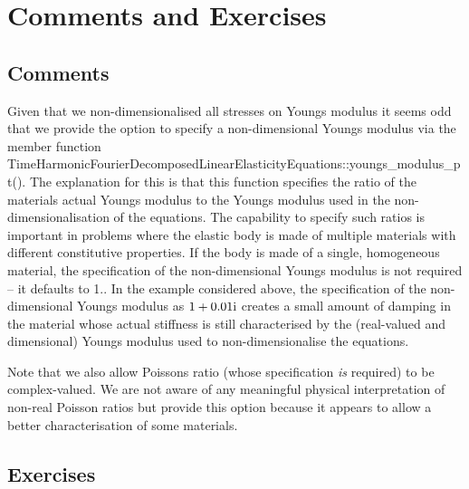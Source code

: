  

\hypertarget{index_conclusion}{}\section{Comments and Exercises}\label{index_conclusion}
\hypertarget{index_comments}{}\subsection{Comments}\label{index_comments}

\begin{DoxyItemize}
\item Given that we non-\/dimensionalised all stresses on Young\textquotesingle{}s modulus it seems odd that we provide the option to specify a non-\/dimensional Young\textquotesingle{}s modulus via the member function {\ttfamily Time\+Harmonic\+Fourier\+Decomposed\+Linear\+Elasticity\+Equations\+::youngs\+\_\+modulus\+\_\+pt()}. The explanation for this is that this function specifies the ratio of the material\textquotesingle{}s actual Young\textquotesingle{}s modulus to the Young\textquotesingle{}s modulus used in the non-\/dimensionalisation of the equations. The capability to specify such ratios is important in problems where the elastic body is made of multiple materials with different constitutive properties. If the body is made of a single, homogeneous material, the specification of the non-\/dimensional Young\textquotesingle{}s modulus is not required -- it defaults to 1.. In the example considered above, the specification of the non-\/dimensional Young\textquotesingle{}s modulus as $ 1 + 0.01 {\rm i} $ creates a small amount of damping in the material whose actual stiffness is still characterised by the (real-\/valued and dimensional) Young\textquotesingle{}s modulus used to non-\/dimensionalise the equations.
\item Note that we also allow Poisson\textquotesingle{}s ratio (whose specification {\itshape is} required) to be complex-\/valued. We are not aware of any meaningful physical interpretation of non-\/real Poisson ratios but provide this option because it appears to allow a better characterisation of some materials.
\end{DoxyItemize}\hypertarget{index_exercises}{}\subsection{Exercises}\label{index_exercises}

